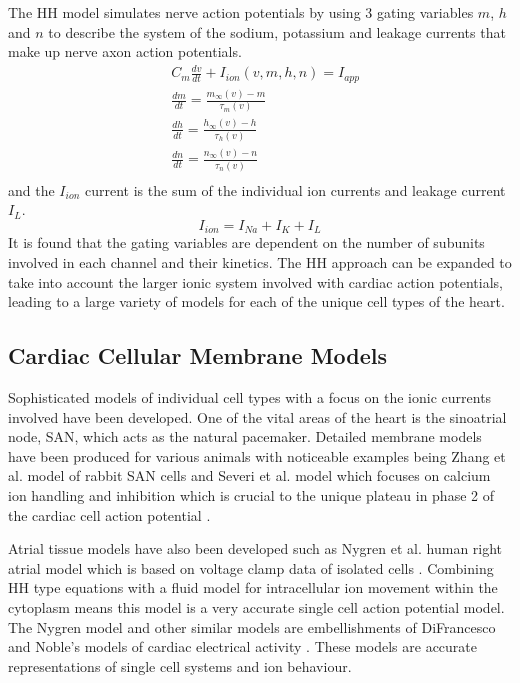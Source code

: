 The HH model simulates nerve action potentials by using 3 gating variables $m$, $h$ and $n$ to describe the system of the sodium, potassium and leakage currents that make up nerve axon action potentials.
\begin{equation}
    \begin{split}
        & C_m\frac{dv}{dt} + I_{ion}(v,m,h,n) = I_{app} \\
        & \frac{dm}{dt}=\frac{m_\infty(v) - m}{\tau_m(v)} \\
        & \frac{dh}{dt}=\frac{h_\infty(v) - h}{\tau_h(v)} \\
        & \frac{dn}{dt}=\frac{n_\infty(v) - n}{\tau_n(v)} \\
    \end{split}
\end{equation}
and the $I_{ion}$ current is the sum of the individual ion currents and leakage current $I_L$.
\begin{equation}
    I_{ion}=I_{Na}+I_{K}+I_{L}
\end{equation}
It is found that the gating variables are dependent on the number of subunits involved in each channel and their kinetics. The HH approach can be expanded to take into account the larger ionic system involved with cardiac action potentials, leading to a large variety of models for each of the unique cell types of the heart.

\subsection{Cardiac Cellular Membrane Models}
\label{ccmm}

Sophisticated models of individual cell types with a focus on the ionic currents involved have been developed. One of the vital areas of the heart is the sinoatrial node, SAN, which acts as the natural pacemaker. Detailed membrane models have been produced for various animals with noticeable examples being Zhang et al. model of rabbit SAN cells \citep{zhangsan} and Severi et al. model which focuses on calcium ion handling and inhibition which is crucial to the unique plateau in phase 2 of the cardiac cell action potential \citep{severisan}. \par

Atrial tissue models have also been developed such as Nygren et al. human right atrial model which is based on voltage clamp data of isolated cells \citep{nygrenatrial}. Combining HH type equations with a fluid model for intracellular ion movement within the cytoplasm means this model is a very accurate single cell action potential model. The Nygren model and other similar models are embellishments of DiFrancesco and Noble's models of cardiac electrical activity \citep{DiFrancescoNoble}. These models are accurate representations of single cell systems and ion behaviour. \par

